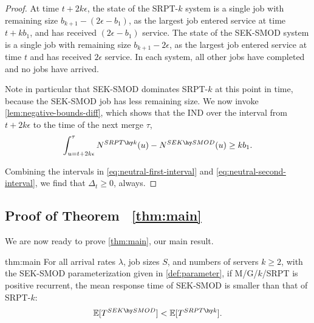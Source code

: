 \documentclass[acmsmall]{acmart}
\newcommand{\E}[1]{\mathbb{E}[#1]}
\begin{document}
\begin{proof}
    At time $t+2k\epsilon$,
    the state of the SRPT-$k$ system is a single job with remaining size $b_{k+1} - (2\epsilon - b_1)$,
    as the largest job entered service at time $t+kb_1$, and has received $(2\epsilon - b_1)$ service.
    The state of the SEK-SMOD system is a single job with remaining size $b_{k+1} - 2\epsilon$,
    as the largest job entered service at time $t$ and has received $2\epsilon$ service.
    In each system, all other jobs have completed and no jobs have arrived.

    Note in particular that SEK-SMOD dominates SRPT-$k$ at this point in time,
    because the SEK-SMOD job has less remaining size. 
    We now invoke \cref{lem:negative-bounds-diff}, which shows that the IND
    over the interval from $t+2k\epsilon$ to the time of the next merge $\tau$,
    \begin{align}
        \label{eq:neutral-second-interval}
        \int_{u=t+2k\epsilon}^{\tau} N^{SRPT\hy k}(u) - N^{SEK \hy SMOD}(u) \ge kb_1.
    \end{align}

    Combining the intervals in \eqref{eq:neutral-first-interval} and \eqref{eq:neutral-second-interval},
    we find that $\Delta_t \ge 0$, always.
\end{proof}

\subsection{Proof of Theorem ~\ref{thm:main}}
\label{sec:main-proof}

We are now ready to prove \cref{thm:main}, our main result.

\begin{reptheorem}{thm:main}
    For all arrival rates $\lambda$, job sizes $S$, and numbers of servers $k\geq 2$,
    with the SEK-SMOD parameterization given in \cref{def:parameter},
    if M/G/$k$/SRPT is positive recurrent,
    the mean response time of SEK-SMOD is smaller than that of SRPT-$k$:
    \begin{align*}
        \E{T^{SEK \hy SMOD}} < \E{T^{SRPT \hy k}}. 
    \end{align*}
\end{reptheorem}
\end{document}
